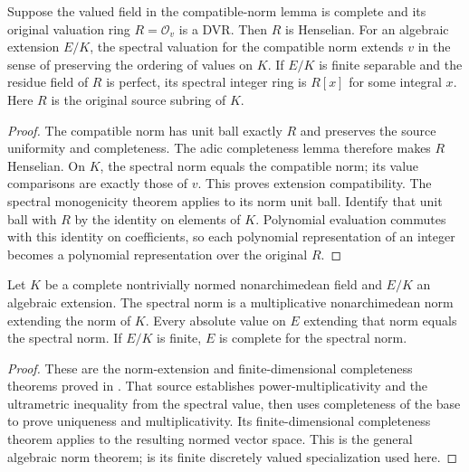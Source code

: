 \begin{lemma}
\label{fw:source-spectral-generation}
\leanok
Suppose the valued field in the compatible-norm lemma is complete and
its original valuation ring $R=\mathcal O_v$ is a DVR. Then $R$ is
Henselian. For an algebraic extension $E/K$, the spectral valuation
for the compatible norm extends $v$ in the sense of preserving the
ordering of values on $K$. If $E/K$ is finite separable and the residue
field of $R$ is perfect, its spectral integer ring is $R[x]$ for some
integral $x$. Here $R$ is the original source subring of $K$.
\end{lemma}
\begin{proof}
The compatible norm has unit ball exactly $R$ and preserves the source
uniformity and completeness. The adic completeness lemma therefore
makes $R$ Henselian. On $K$, the spectral norm equals the compatible
norm; its value comparisons are exactly those of $v$. This proves
extension compatibility. The spectral monogenicity theorem applies
to its norm unit ball. Identify that unit ball with $R$ by the identity
on elements of $K$. Polynomial evaluation commutes with this identity
on coefficients, so each polynomial representation of an integer
becomes a polynomial representation over the original $R$.
\end{proof}


\begin{theorem}
\label{fw:spectral-norm-extension}
\mathlibok
Let $K$ be a complete nontrivially normed nonarchimedean field and
$E/K$ an algebraic extension. The spectral norm is a multiplicative
nonarchimedean norm extending the norm of $K$. Every absolute value on
$E$ extending that norm equals the spectral norm. If $E/K$ is finite,
$E$ is complete for the spectral norm.
\end{theorem}
\begin{proof}
These are the norm-extension and finite-dimensional completeness
theorems proved in \cite{MathlibSpectralNorm}. That source establishes
power-multiplicativity and the ultrametric inequality from the spectral
value, then uses completeness of the base to prove uniqueness and
multiplicativity. Its finite-dimensional completeness theorem applies
to the resulting normed vector space. This is the general algebraic
norm theorem; \cite[Chapter II, Section 2, Proposition 3]{Serre1979}
is its finite discretely valued specialization used here.
\end{proof}

